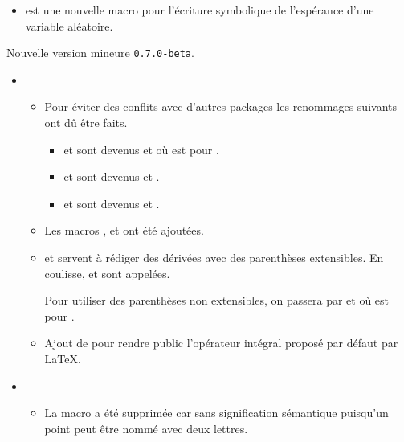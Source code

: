 \documentclass[12pt,a4paper]{book}
\begin{document}
\begin{description}
\begin{itemize}[itemsep=.5em]
\begin{itemize}[itemsep=.5em]
        \item {} est une nouvelle macro pour l'écriture symbolique de l'espérance d'une  variable aléatoire.
    \end{itemize}
\end{itemize}


\end{description}\begin{description}
\medskip
\item[2020-06-08] Nouvelle version mineure \verb+0.7.0-beta+.

\begin{itemize}[itemsep=.5em]
    \item {}
    \begin{itemize}[itemsep=.5em]
        \item Pour éviter des conflits avec d'autres packages les renommages suivants ont dû être faits.
        \begin{itemize}[itemsep=.5em, label=$\rightarrow$]
            \item {} et  sont devenus  et  où  est pour .

            \item {} et  sont devenus  et .

            \item {} et  sont devenus  et .
        \end{itemize}

		\item Les macros ,  et  ont été ajoutées.

 		\item {} et  servent à rédiger des dérivées avec des parenthèses extensibles. En coulisse,  et  sont appelées.

        Pour utiliser des parenthèses non extensibles, on passera par  et  où  est pour .

		\item Ajout de  pour rendre public l'opérateur intégral proposé par défaut par \LaTeX.
    \end{itemize}




    \item {}
    \begin{itemize}[itemsep=.5em]
        \item La macro  a été supprimée car sans signification sémantique puisqu'un point peut être nommé avec deux lettres.


\end{itemize}
\end{itemize}
\end{description}
\end{document}
